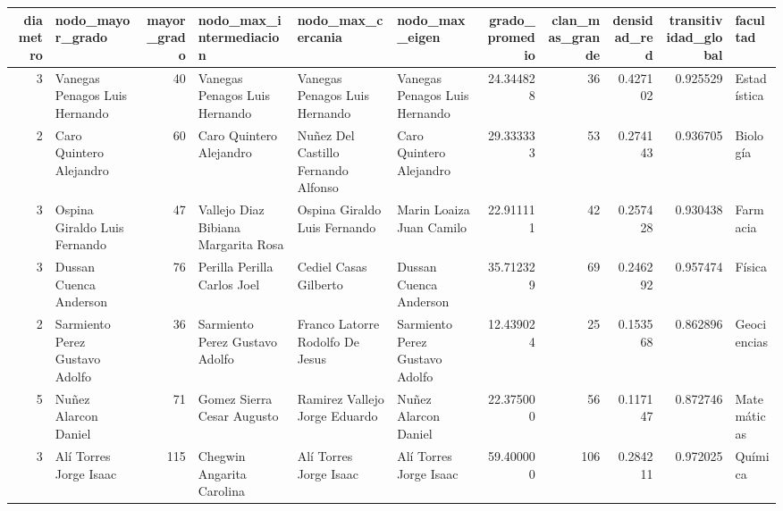 \begin{tabular}{rlrlllrrrrl}
\toprule
diametro & nodo_mayor_grado & mayor_grado & nodo_max_intermediacion & nodo_max_cercania & nodo_max_eigen & grado_promedio & clan_mas_grande & densidad_red & transitividad_global & facultad \\
\midrule
3 & Vanegas Penagos Luis Hernando & 40 & Vanegas Penagos Luis Hernando & Vanegas Penagos Luis Hernando & Vanegas Penagos Luis Hernando & 24.344828 & 36 & 0.427102 & 0.925529 & Estadística \\
2 & Caro Quintero Alejandro & 60 & Caro Quintero Alejandro & Nuñez Del Castillo Fernando Alfonso & Caro Quintero Alejandro & 29.333333 & 53 & 0.274143 & 0.936705 & Biología \\
3 & Ospina Giraldo Luis Fernando & 47 & Vallejo Diaz Bibiana Margarita Rosa & Ospina Giraldo Luis Fernando & Marin Loaiza Juan Camilo & 22.911111 & 42 & 0.257428 & 0.930438 & Farmacia \\
3 & Dussan Cuenca Anderson & 76 & Perilla Perilla Carlos Joel & Cediel Casas Gilberto & Dussan Cuenca Anderson & 35.712329 & 69 & 0.246292 & 0.957474 & Física \\
2 & Sarmiento Perez Gustavo Adolfo & 36 & Sarmiento Perez Gustavo Adolfo & Franco Latorre Rodolfo De Jesus & Sarmiento Perez Gustavo Adolfo & 12.439024 & 25 & 0.153568 & 0.862896 & Geociencias \\
5 & Nuñez Alarcon Daniel & 71 & Gomez Sierra Cesar Augusto & Ramirez Vallejo Jorge Eduardo & Nuñez Alarcon Daniel & 22.375000 & 56 & 0.117147 & 0.872746 & Matemáticas \\
3 & Alí Torres Jorge Isaac & 115 & Chegwin Angarita Carolina & Alí Torres Jorge Isaac & Alí Torres Jorge Isaac & 59.400000 & 106 & 0.284211 & 0.972025 & Química \\
\bottomrule
\end{tabular}
